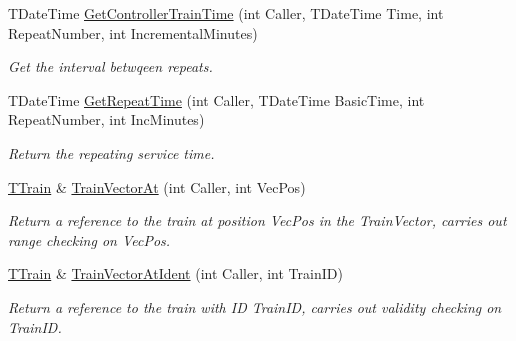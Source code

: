 \begin{DoxyCompactItemize}
\mbox{\label{class_t_train_controller_a2713e7d4bb329d65df8b3fa0ad59b6cf}} 
T\+Date\+Time \mbox{\hyperlink{class_t_train_controller_a2713e7d4bb329d65df8b3fa0ad59b6cf}{Get\+Controller\+Train\+Time}} (int Caller, T\+Date\+Time Time, int Repeat\+Number, int Incremental\+Minutes)
\begin{DoxyCompactList}\small\item\em Get the interval betwqeen repeats. \end{DoxyCompactList}\item 
\mbox{\label{class_t_train_controller_a435ef46f062904e85ae9792faaecdcf7}} 
T\+Date\+Time \mbox{\hyperlink{class_t_train_controller_a435ef46f062904e85ae9792faaecdcf7}{Get\+Repeat\+Time}} (int Caller, T\+Date\+Time Basic\+Time, int Repeat\+Number, int Inc\+Minutes)
\begin{DoxyCompactList}\small\item\em Return the repeating service time. \end{DoxyCompactList}\item 
\mbox{\label{class_t_train_controller_aa09adf9c442406cccc270d6703867a1d}} 
\mbox{\hyperlink{class_t_train}{T\+Train}} \& \mbox{\hyperlink{class_t_train_controller_aa09adf9c442406cccc270d6703867a1d}{Train\+Vector\+At}} (int Caller, int Vec\+Pos)
\begin{DoxyCompactList}\small\item\em Return a reference to the train at position Vec\+Pos in the Train\+Vector, carries out range checking on Vec\+Pos. \end{DoxyCompactList}\item 
\mbox{\label{class_t_train_controller_a4d5de42d6e9e92191241963599581210}} 
\mbox{\hyperlink{class_t_train}{T\+Train}} \& \mbox{\hyperlink{class_t_train_controller_a4d5de42d6e9e92191241963599581210}{Train\+Vector\+At\+Ident}} (int Caller, int Train\+ID)
\begin{DoxyCompactList}\small\item\em Return a reference to the train with ID Train\+ID, carries out validity checking on Train\+ID. \end{DoxyCompactList}\item 
\mbox{\label{class_t_train_controller_a0445987b1a355de3aef2c21b66d1ed8b}} 

\end{DoxyCompactItemize}
